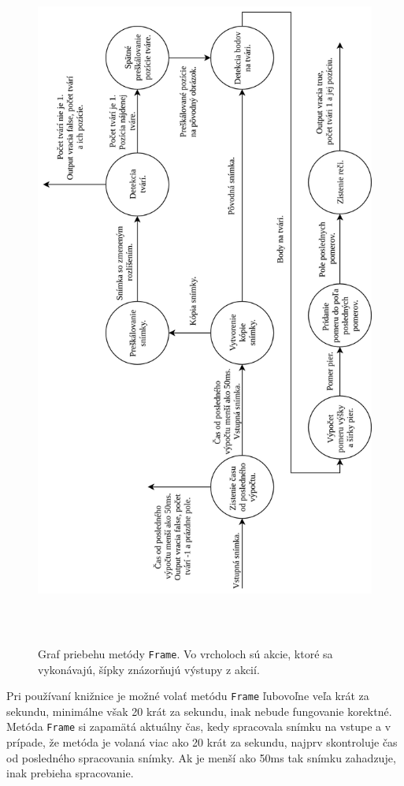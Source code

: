 \begin{figure}[H]
	\begin{center}
		\includegraphics[height=23cm]{pics/Frame.jpg}
		\caption{Graf priebehu metódy \texttt{Frame}. Vo vrcholoch sú akcie, ktoré sa vykonávajú, šípky znázorňujú výstupy z akcií.}
		\label{pic-Frame}
	\end{center}
\end{figure}

Pri používaní knižnice je možné volať metódu \texttt{Frame} ľubovoľne veľa krát za sekundu, minimálne však 20 krát za sekundu, inak nebude fungovanie korektné.
Metóda \texttt{Frame} si zapamätá aktuálny čas, kedy spracovala snímku na vstupe a v prípade, že metóda je volaná viac ako 20 krát za sekundu, najprv skontroluje čas od posledného spracovania snímky.
Ak je menší ako 50ms tak snímku zahadzuje, inak prebieha spracovanie.

